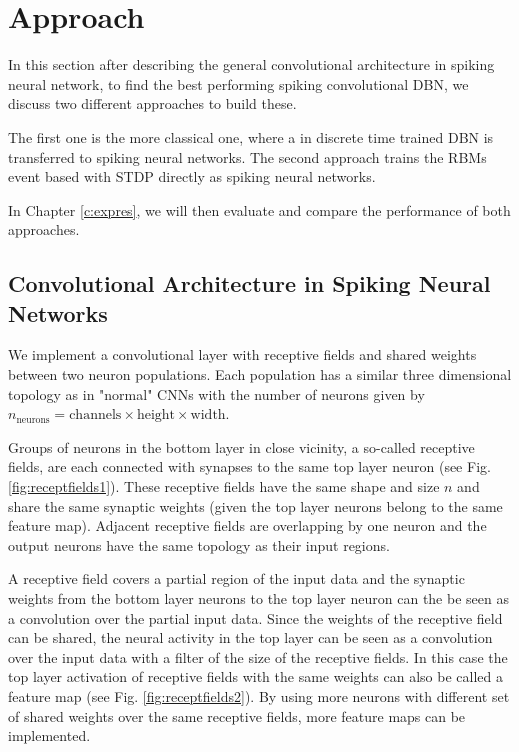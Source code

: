\chapter{Approach} \label{c:approach}

In this section after describing the general convolutional architecture in spiking neural network, to find the best performing spiking convolutional DBN, we discuss two different approaches to build these.

The first one is the more classical one, where a in discrete time trained DBN is transferred to spiking neural networks.
The second approach trains the RBMs event based with STDP directly as spiking neural networks. 

In Chapter \ref{c:expres}, we will then evaluate and compare the performance of both approaches.

\section{Convolutional Architecture in Spiking Neural Networks} \label{c:spikingconvarch}

We implement a convolutional layer with receptive fields and shared weights between two neuron populations. 
Each population has a similar three dimensional topology as in "normal" CNNs with the number of neurons given by $n_{ \text{neurons}} = \text{channels} \times \text{height} \times \text{width}$.

Groups of neurons in the bottom layer in close vicinity, a so-called receptive fields, are each connected with synapses to the same top layer neuron (see Fig. \ref{fig:receptfields1}).
These receptive fields have the same shape and size $n$ and share the same synaptic weights (given the top layer neurons belong to the same feature map).
Adjacent receptive fields are overlapping by one neuron and the output neurons have the same topology as their input regions. 

A receptive field covers a partial region of the input data and the synaptic weights from the bottom layer neurons to the top layer neuron can the be seen as a convolution over the partial input data.
Since the weights of the receptive field can be shared, the neural activity in the top layer can be seen as a convolution over the input data with a filter of the size of the receptive fields.
In this case the top layer activation of receptive fields with the same weights can also be called a feature map  (see Fig. \ref{fig:receptfields2}).
By using more neurons with different set of shared weights over the same receptive fields, more feature maps can be implemented.     

